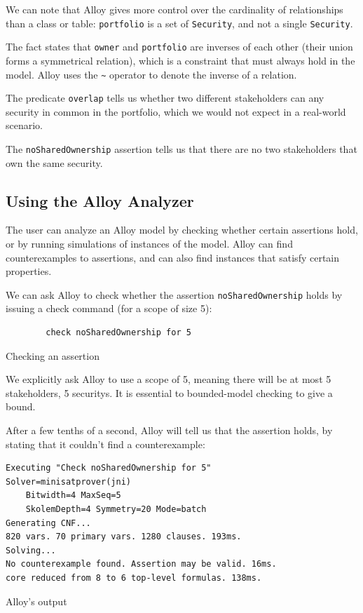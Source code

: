 We can note that Alloy gives more control over the cardinality of relationships than a class or table: \verb|portfolio| is a set of \verb|Security|, and not a single \verb|Security|.

The fact states that \verb|owner| and \verb|portfolio| are inverses of each other (their union forms a symmetrical relation), which is a constraint that must always hold in the model. Alloy uses the \verb|~| operator to denote the inverse of a relation.

The predicate \verb|overlap| tells us whether two different \glspl{stakeholder} can any \gls{security} in common in the portfolio, which we would not expect in a real-world scenario.

The \verb|noSharedOwnership| assertion tells us that there are no two \glspl{stakeholder} that own the same security.

\subsection{Using the Alloy Analyzer}

The user can analyze an Alloy model by checking whether certain assertions hold, or by running simulations of instances of the model. Alloy can find counterexamples to assertions, and can also find instances that satisfy certain properties.

We can ask Alloy to check whether the assertion \verb|noSharedOwnership| holds by issuing a check command (for a scope of size 5):

\begin{listing}
	\begin{verbatim}
		check noSharedOwnership for 5
	\end{verbatim}
	\caption{Checking an assertion}
	\label{lst:alloy-check}
\end{listing}

We explicitly ask Alloy to use a scope of 5, meaning there will be at most 5 stakeholders, 5 \glspl{security}.  It is essential to bounded-model checking to give a bound.

After a few tenths of a second, Alloy will tell us that the assertion holds, by stating that it couldn't find a counterexample:

\begin{listing}\label{lst:alloy-check-output}
	\begin{verbatim}
Executing "Check noSharedOwnership for 5"
Solver=minisatprover(jni) 
    Bitwidth=4 MaxSeq=5 
    SkolemDepth=4 Symmetry=20 Mode=batch
Generating CNF...
820 vars. 70 primary vars. 1280 clauses. 193ms.
Solving...
No counterexample found. Assertion may be valid. 16ms.
core reduced from 8 to 6 top-level formulas. 138ms.
\end{verbatim}
	\caption{Alloy's output}
\end{listing}

